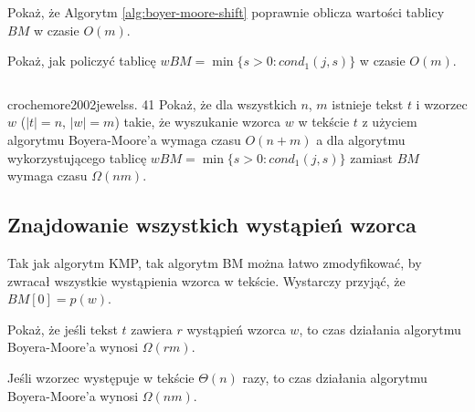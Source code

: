 \begin{code}
\inputminted{python}{code/other/boyer-moore-shift.py}
\label{alg:boyer-moore-shift}
\end{code}

\begin{problem}{}{}
  Pokaż, że Algorytm \ref{alg:boyer-moore-shift} poprawnie oblicza wartości tablicy $BM$ w czasie $O(m)$.
\end{problem}


\begin{problem}{}{}
    Pokaż, jak policzyć tablicę $wBM = \min\{s > 0: cond_1(j, s)\}$ w czasie $O(m)$.
\end{problem}

\begin{code}
\inputminted{python}{code/exact-string-matching/boyer-moore.py}
\label{alg:exact-string-matching-boyer-moore}
\end{code}

\begin{problem}{crochemore2002jewels}{s. 41}
  Pokaż, że dla wszystkich $n$, $m$ istnieje tekst $t$ i wzorzec $w$ ($|t| = n$, $|w| = m$) takie, że wyszukanie wzorca $w$ w tekście $t$
  z użyciem algorytmu Boyera-Moore'a wymaga czasu $O(n + m)$ a dla algorytmu wykorzystującego tablicę $wBM = \min\{s > 0: cond_1(j, s)\}$ zamiast $BM$ wymaga czasu $\Omega(n m)$.
\end{problem}


\subsection{Znajdowanie wszystkich wystąpień wzorca}

Tak jak algorytm KMP, tak algorytm BM można łatwo zmodyfikować, by zwracał wszystkie wystąpienia wzorca w tekście. Wystarczy przyjąć, że $BM[0] = p(w)$.
\begin{problem}{}{}
  Pokaż, że jeśli tekst $t$ zawiera $r$ wystąpień wzorca $w$, to czas działania algorytmu Boyera-Moore'a wynosi $\Omega(r m)$.
\end{problem}

\begin{corollary}{}{}
  Jeśli wzorzec występuje w tekście $\Theta(n)$ razy, to czas działania algorytmu Boyera-Moore'a wynosi $\Omega(n m)$.
\end{corollary}

